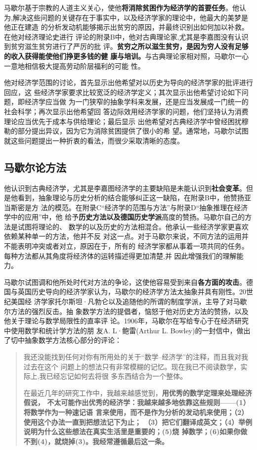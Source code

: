 马歇尔基于宗教的人道主义关心，使他\textbf{将消除贫困作为经济学的首要任务}。他认
为,解决这些问题的关键存在于事实中，以及经济学家的理论中，他最大的美梦是他正在建造
的分析发动机能够揭示出贫穷的原因，并最终识别出如何加以补救。在他对经济理论史进行
评论的附录B中，他对古典理论家,尤其是李嘉图没有认识到贫穷滋生贫穷进行了严厉的批
评。\textbf{贫穷之所以滋生贫穷，是因为穷人没有足够的收入获得能使他们挣更多钱的健
  康与培训。}与古典理论家相对照，马歇尔一心一意地相信极大提高劳动阶层福利的可能
性。

他对经济学范围的讨论，首先显示出他希望对以历史为导向的经济学家的批评进行回应，这
些经济学家要求比较宽泛的经济学定义；其次显示出他希望讨论如下问题，即经济学应当做
为一门狭窄的抽象学科来发展，还是应当发展成一门统一的社会科学；再次显示出他希望回
答边际效用经济学家的问题，他们坚持认为消费理论应当优先于成本与供给理论；最后显示
出他希望对古典经济学中曾经困扰穆勒的部分提出异议，因为它为消除贫困提供了很小的希
望。通常地，马歇尔试图就这些问题提出一种折衷的看法，而很少采取清晰的态度。

\subsection{马歇尔论方法}

他认识到古典经济学，尤其是李嘉图经济学的主要缺陷是未能认识到\textbf{社会变革}。但
是他看到，抽象理论与历史分析的结合能够纠正这一缺陷，在附录B中，他赞扬亚当斯密是方
法的模范。在附录C“经济学的范围与方法”与附录D“抽象推理在经济学中的应用”中，他
给予\textbf{历史方法以及德国历史学派}高度的赞扬。马歇尔自己的方法是试图将理论的、
数学的以及历史的方法相混合。他承认一些经济学家更喜欢依赖某种单一的方法，他并不反
对这一点。对于马歇尔来说，不同方法的运用并不能表明冲突或者对立，原因在于，所有的
经济学家都从事着一项共同的任务。每种方法都从其角度将经济体的运转描述得更加清楚,并
因此增强我们的理解能力。

马歇尔试图调和他所处时代对方法的争论，这使他容易受到来自\textbf{各方面的攻击}。德
国与英国历史导向的经济学家认为，马歇尔的经济学方法太抽象并具有刚性。20世纪美国经
济学家托尔斯坦·凡勃仑以及追随他的所谓的制度学派，主导了对马歇尔方法的强烈反击。抽
象数学方法的提倡者，恼怒于他对历史方法的赞扬，以及他关于理论与数学局限性的直率评
论。1906年，马歇尔在写给专心于在经济研究中使用数学和统计学方法的朋
友A. L·鲍雷(Arthur L. Bowley)的一封信中，做出了切中抽象数学方法核心部分的评论：
\begin{quotation}
  我还没能找到任何对你有所用处的关于“数学--经济学”的注释，而且我对我过去在这个
  问题上的想法只有非常模糊的记忆。现在我已不阅读数学，实际上,我已经忘记如何去将很
  多东西结合为一个整体。

  在最近几年的研究工作中，我越来越感觉到，\textbf{用优秀的数学定理来处理经济假说，
    不太可能作出优秀的经济学：我越来越多地依靠这些规则——(1）将数学作为一种速记语
    言来使用，而不是作为分析的发动机来使用；（2）使用这个办法一直到把想法记下为止；
    （3）把它们翻译成英文；（4）举例说明为什么这些想法在真实生活里是重要的；(5)烧
    掉数学；(6)如果你做不到(4)，就烧掉(3)。我经常遵循最后这一条。}
\end{quotation}

